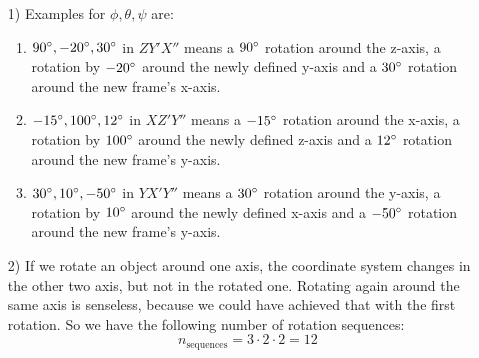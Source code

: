 \documentclass[a4paper,11pt]{article}
\begin{document}
\begin {enumerate}
    \begin{enumerate}
        \item[1)] Examples for $\phi, \theta, \psi$ are:
        	\begin{enumerate}
        		\item $90\degree, -20\degree, 30\degree$ in $ZY'X''$ means a $90\degree$ rotation around the z-axis, a rotation by $-20\degree$ around the newly defined y-axis and a $30\degree$ rotation around the new frame's x-axis.
        		\item $-15\degree, 100\degree, 12\degree$ in $XZ'Y''$ means a $-15\degree$ rotation around the x-axis, a rotation by $100\degree$ around the newly defined z-axis and a $12\degree$ rotation around the new frame's y-axis.
        		\item $30\degree, 10\degree, -50\degree$ in $YX'Y''$ means a $30\degree$ rotation around the y-axis, a rotation by $10\degree$ around the newly defined x-axis and a $-50\degree$ rotation around the new frame's y-axis.
        	\end{enumerate}
        \item[2)] If we rotate an object around one axis, the coordinate system changes in the other two axis, but not in the rotated one. Rotating again around the same axis is senseless, because we could have achieved that with the first rotation. So we have the following number of rotation sequences:
        $$n_{\text{sequences}} = 3 \cdot 2 \cdot 2 = 12$$
    \end{enumerate}

\end {enumerate}
\end{document}
